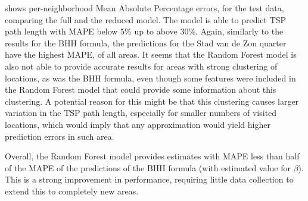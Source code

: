  shows per-neighborhood Mean Absolute Percentage errors, for the test data, comparing the full and the reduced model.
The model is able to predict TSP path length with MAPE below 5\% up to above 30\%.
Again, similarly to the results for the BHH formula, the predictions for the Stad van de Zon quarter have the highest MAPE, of all areas.
It seems that the Random Forest model is also not able to provide accurate results for areas with strong clustering of locations, as was the BHH formula, even though some features were included in the Random Forest model that could provide some information about this clustering.
A potential reason for this might be that this clustering causes larger variation in the TSP path length, especially for smaller numbers of visited locations, which would imply that any approximation would yield higher prediction errors in such area.

Overall, the Random Forest model provides estimates with MAPE less than half of the MAPE of the predictions of the BHH formula (with estimated value for $\beta$).
This is a strong improvement in performance, requiring little data collection to extend this to completely new areas.
